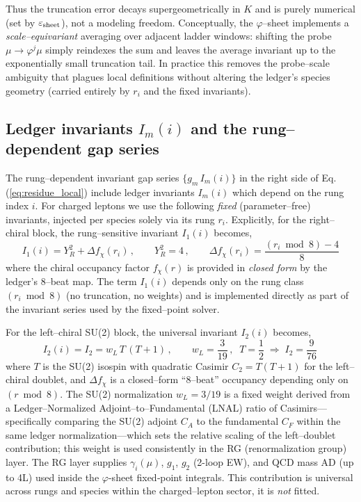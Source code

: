 \documentclass[%
  amsmath,amssymb,
  aps,
 prb,
 floatfix, showkeys
 ]{revtex4-2}
\begin{document}
 Thus the truncation error decays supergeometrically in $K$ and is purely numerical
 (set by $\varepsilon_{\rm sheet}$), not a modeling freedom.
 Conceptually, the $\varphi$--sheet implements a \emph{scale–equivariant} averaging over
 adjacent ladder windows: shifting the probe $\mu\!\to\!\varphi^j\mu$ simply reindexes
 the sum and leaves the average invariant up to the exponentially small truncation tail.
 In practice this removes the probe--scale ambiguity that plagues local definitions without
 altering the ledger’s species geometry (carried entirely by $r_i$ and the fixed invariants).
 
 \subsection{Ledger invariants $I_m(i)$ and the rung–dependent gap series}
 \label{subsec:ledger-invariants}
 The rung--dependent invariant gap series
 $\{g_m\,I_m(i)\}$ in the right side of
 Eq.(\ref{eq:residue_local}) include ledger invariants $I_m(i)$ which depend on the
 rung index $i$. 
 For charged leptons we use the following \emph{fixed} (parameter–free) invariants,
 injected per species solely via its rung $r_i$.
 Explicitly, for the right--chiral block, the rung--sensitive 
 invariant $I_1(i)$  becomes,
 \begin{equation}
   I_1(i) =  Y_R^2  + \Delta f_\chi(r_i) \,, \qquad Y_R^2 = 4  \, , \qquad 
   \Delta f_\chi(r_i) = \frac{(r_i\bmod 8) - 4}{8} 
   \label{eq:I1_def}
 \end{equation}
 where the chiral occupancy factor $f_\chi(r)$ is provided in \emph{closed form}
 by the ledger’s 8--beat map.
 The term  $I_1(i)$ depends only on the rung class $(r_i\bmod 8)$
 (no truncation, no weights) and is implemented directly as part of
 the invariant series used by the fixed--point solver.
 
 For the left--chiral SU(2) block, the universal invariant $I_2(i)$ becomes, 
 \begin{equation}
   I_2(i)  = I_2 = w_L\,T\,(T+1) \, ,  \qquad w_L=\frac{3}{19}\,,\;\;
   T=\frac{1}{2}\;\Rightarrow\; I_2=\frac{9}{76}\,
 \label{eq:I2_def}
 \end{equation}
 where  $T$ is the SU(2) isospin with quadratic Casimir $C_2 = T(T+1)$ for the
 left–chiral doublet, and $\Delta f_\chi$ is a closed–form ``8–beat''
 occupancy depending only on $(r\bmod 8)$. The SU(2) normalization $w_L=3/19$
 is a fixed weight derived from a Ledger–Normalized Adjoint–to–Fundamental (LNAL) ratio of Casimirs—specifically comparing the SU(2) adjoint $C_A$ to the fundamental $C_F$ within the same ledger normalization—which sets the relative scaling of the left–doublet contribution; this weight is used consistently in the RG (renormalization group)  layer.
 The RG layer supplies $\gamma_i(\mu)$, $g_1$, $g_2$ (2-loop EW), and
 QCD mass AD (up to 4L) used inside the $\varphi$-sheet fixed‑point integrals.
 This contribution is universal across rungs and species within the charged--lepton sector,
  it is \emph{not} fitted.
 
\end{document}
